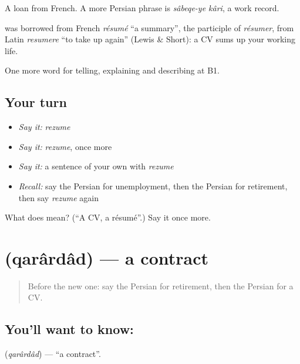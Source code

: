 A loan from French. A more Persian phrase is \emph{sâbeqe-ye kâri}, a work record.

\begin{cousinweb}
\textbf{} was borrowed from French \emph{résumé} \textquotedblleft{}a summary\textquotedblright{}, the participle of \emph{résumer}, from Latin \emph{resumere} \textquotedblleft{}to take up again\textquotedblright{} (Lewis \& Short): a CV sums up your working life.
\end{cousinweb}

\begin{grammarlens}[title={What you've built}]
One more word for telling, explaining and describing at B1.
\end{grammarlens}

\subsection*{Your turn}
\begin{itemize}
\raggedright
  \item \emph{Say it:} \emph{rezume}
  \item \emph{Say it:} \emph{rezume}, once more
  \item \emph{Say it:} a sentence of your own with \emph{rezume}
  \item \emph{Recall:} say the Persian for unemployment, then the Persian for retirement, then say \emph{rezume} again
\end{itemize}

\begin{tcolorbox}[breakable,colback=teal!4,colframe=teal!35!black,title={Before you move on}]
What does  mean? (\textquotedblleft{}A CV, a résumé\textquotedblright{}.) Say it once more.
\end{tcolorbox}
\section[\texorpdfstring{\fa{قرارداد} (qarârdâd)}{قرارداد (qarârdâd)}]{ (qarârdâd) — a contract}

\label{lesson:FA-C380-qarardad}



\begin{quote}
Before the new one: say the Persian for retirement, then the Persian for a CV.
\end{quote}

\subsection*{You'll want to know: }
\textbf{} (\emph{qarârdâd}) — \textquotedblleft{}a contract\textquotedblright{}.

